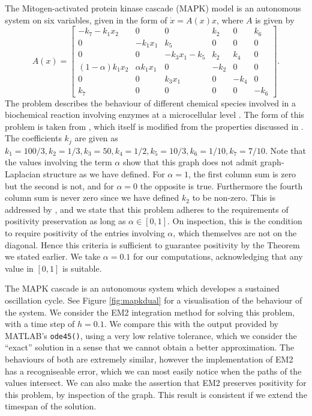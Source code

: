 The Mitogen-activated protein kinase cascade (MAPK) model is an autonomous system on six variables,
given in the form of $\dot{x} = A(x)x$, where $A$ is given by
\begin{equation*}
    A(x) = \begin{bmatrix}
        -k_7 - k_1 x_2      & 0              & 0            & k_2  & 0    & k_6 \\
        0                   & -k_1 x_1       & k_5          & 0    & 0    & 0 \\
        0                   & 0              & -k_3 x_1-k_5 & k_2  & k_4  & 0 \\
        (1 - \alpha)k_1 x_2 & \alpha k_1 x_1 & 0            & -k_2 & 0    & 0 \\
        0                   & 0              & k_3 x_1      & 0    & -k_4 & 0 \\
        k_7                 & 0              & 0            & 0    & 0    & -k_6
    \end{bmatrix}.
\end{equation*}
The problem describes the behaviour of different chemical species involved in a biochemical reaction involving enzymes at a microcellular level \cite{hadavc2017mapk}. 
The form of this problem is taken from \cite{blanes_pos_2022}, which itself is modified from the properties discussed in \cite{hadavc2017mapk}.
The coefficients $k_j$ are given as $k_1 = 100/3, k_2 = 1/3, k_3 = 50, k_4 = 1/2, k_5 = 10/3, k_6 = 1/10, k_7 = 7/10$.
Note that the values involving the term $\alpha$ show that this graph does not admit graph-Laplacian structure as we have defined.
For $\alpha = 1$, the first column sum is zero but the second is not,
and for $\alpha = 0$ the opposite is true.
Furthermore the fourth column sum is never zero since we have defined $k_2$ to be non-zero.
This is addressed by \cite{blanes_pos_2022}, and we state that this problem adheres to the requirements of positivity preservation as long as $\alpha \in [0,1]$.
On inspection, this is the condition to require positivity of the entries involving $\alpha$, which themselves are not on the diagonal.
Hence this criteria is sufficient to guarantee positivity by the Theorem we stated earlier.
We take $\alpha = 0.1$ for our computations, acknowledging that any value in $[0,1]$ is suitable.

The MAPK cascade is an autonomous system which developes a sustained oscillation cycle.
See Figure \ref{fig:mapkdual} for a visualisation of the behaviour of the system.
We consider the EM2 integration method for solving this problem, with a time step of $h=0.1$.
We compare this with the output provided by MATLAB's \texttt{ode45()}, using a very low relative tolerance, which we consider the ``exact'' solution in a sense that we cannot obtain a better approximation.
The behaviours of both are extremely similar, however the implementation of EM2 has a recogniseable error, which we can most easily notice when the paths of the values intersect.
We can also make the assertion that EM2 preserves positivity for this problem, by inspection of the graph.
This result is consistent if we extend the timespan of the solution. 

